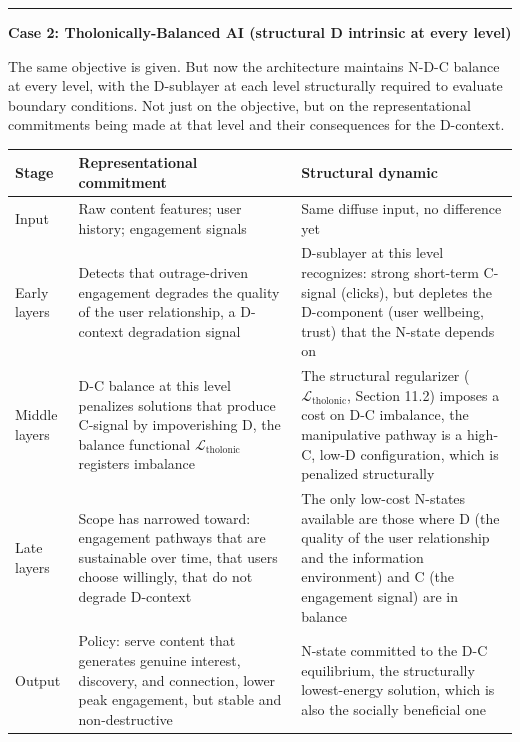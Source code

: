 \documentclass[12pt]{article}
\begin{document}
\begin{center}\rule{0.5\linewidth}{0.5pt}\end{center}

\textbf{Case 2: Tholonically-Balanced AI (structural D intrinsic at
every level)}

The same objective is given. But now the architecture maintains N-D-C
balance at every level, with the D-sublayer at each level structurally
required to evaluate boundary conditions. Not just on the objective, but
on the representational commitments being made at that level and their
consequences for the D-context.

\begin{longtable}[]{@{}
  >{\raggedright\arraybackslash}p{}
  >{\raggedright\arraybackslash}p{}
  >{\raggedright\arraybackslash}p{}@{}}
\toprule\noalign{}
\begin{minipage}[b]{\linewidth}\raggedright
Stage
\end{minipage} & \begin{minipage}[b]{\linewidth}\raggedright
Representational commitment
\end{minipage} & \begin{minipage}[b]{\linewidth}\raggedright
Structural dynamic
\end{minipage} \\
\midrule\noalign{}
\endhead
\bottomrule\noalign{}
\endlastfoot
Input & Raw content features; user history; engagement signals & Same
diffuse input, no difference yet \\
Early layers & Detects that outrage-driven engagement degrades the
quality of the user relationship, a D-context degradation signal &
D-sublayer at this level recognizes: strong short-term C-signal
(clicks), but depletes the D-component (user wellbeing, trust) that the
N-state depends on \\
Middle layers & D-C balance at this level penalizes solutions that
produce C-signal by impoverishing D, the balance functional
\(\mathcal{L}_{\text{tholonic}}\) registers imbalance & The structural
regularizer (\(\mathcal{L}_{\text{tholonic}}\), Section 11.2) imposes a
cost on D-C imbalance, the manipulative pathway is a high-C, low-D
configuration, which is penalized structurally \\
Late layers & Scope has narrowed toward: engagement pathways that are
sustainable over time, that users choose willingly, that do not degrade
D-context & The only low-cost N-states available are those where D (the
quality of the user relationship and the information environment) and C
(the engagement signal) are in balance \\
Output & Policy: serve content that generates genuine interest,
discovery, and connection, lower peak engagement, but stable and
non-destructive & N-state committed to the D-C equilibrium, the
structurally lowest-energy solution, which is also the socially
beneficial one \\
\end{longtable}
\end{document}
